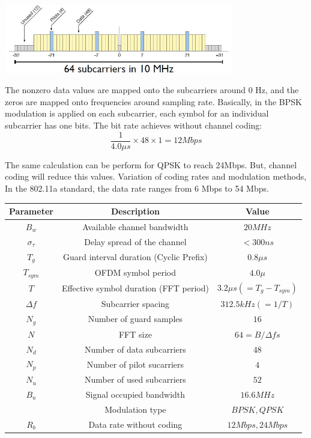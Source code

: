 \begin{center}
\includegraphics[width=10cm]{content/fig/freq_alloc.JPG}
\label{freq_alloc}
\end{center}

The nonzero data values are mapped onto the subcarriers around 0 Hz, and the zeros are mapped onto frequencies around sampling rate.
Basically, in the BPSK modulation is applied on each subcarrier, each symbol for an individual subcarrier has one bits. The bit rate achieves without channel coding:\\

\begin{equation} \label{bitrate_achiv}
\frac{1}{4.0\mu s} \times 48 \times 1= 12Mbps
\end{equation}

The same calculation can be perform for QPSK to reach 24Mbps. But, channel coding will reduce this values. Variation of coding rates and modulation methods, In the 802.11a standard, the data rate ranges from 6 Mbps to 54 Mbps.\\

\begin{center}
\label{table:sys_param}
\vspace{0.5cm}
\begin{tabular}{c|c|c}
Parameter&Description&Value\\ \hline
$B_{w}$&Available channel bandwidth&$20MHz$\\
$\sigma_{\tau}$&Delay spread of the channel& $<300 ns$\\
$T_{g}$&Guard interval duration (Cyclic Prefix)&$0.8\mu s$\\
$T_{sym}$&OFDM symbol period&$4.0\mu$\\
$T$&Effective symbol duration (FFT period)&$3.2\mu s (=T_{g}- T_{sym})$\\
$\Delta f$&Subcarrier spacing&$312.5kHz (=1/T)$\\
$N_{g}$&Number of guard samples&$16$\\
$N$&FFT size&$64= B/\Delta f s$\\
$N_{d}$&Number of data subcarriers&$48$\\
$N_{p}$&Number of pilot sucarriers&$4$\\
$N_{u}$&Number of used subcarriers&$52$\\
$B_{u}$&Signal occupied bandwidth&$16.6MHz$\\
&Modulation type&$BPSK, QPSK$\\
$R_{b}$&Data rate without coding&$12Mbps, 24Mbps$\\
\end{tabular}
\end{center}

